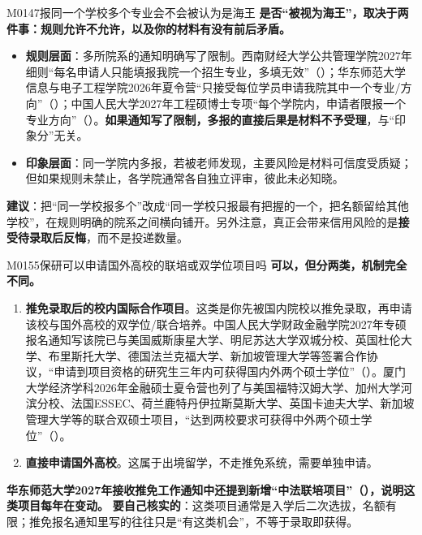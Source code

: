 \begin{qa}{M0147}{报同一个学校多个专业会不会被认为是海王}
\textbf{是否“被视为海王”，取决于两件事：规则允许不允许，以及你的材料有没有前后矛盾。}
\begin{itemize}
  \item \textbf{规则层面}：多所院系的通知明确写了限制。西南财经大学公共管理学院2027年细则“每名申请人只能填报我院一个招生专业，多填无效”（）；华东师范大学信息与电子工程学院2026年夏令营“只接受每位学员申请我院其中一个专业/方向”（）；中国人民大学2027年工程硕博士专项“每个学院内，申请者限报一个专业方向”（）。\textbf{如果通知写了限制，多报的直接后果是材料不予受理}，与“印象分”无关。
  \item \textbf{印象层面}：同一学院内多报，若被老师发现，主要风险是材料可信度受质疑；但如果规则未禁止，各学院通常各自独立评审，彼此未必知晓。
\end{itemize}
\textbf{建议}：把“同一学校报多个”改成“同一学校只报最有把握的一个，把名额留给其他学校”，在规则明确的院系之间横向铺开。另外注意，真正会带来信用风险的是\textbf{接受待录取后反悔}，而不是投递数量。
\end{qa}

\begin{qa}{M0155}{保研可以申请国外高校的联培或双学位项目吗}
\textbf{可以，但分两类，机制完全不同。}
\begin{enumerate}
  \item \textbf{推免录取后的校内国际合作项目}。这类是你先被国内院校以推免录取，再申请该校与国外高校的双学位/联合培养。中国人民大学财政金融学院2027年专硕报名通知写该院已与美国威斯康星大学、明尼苏达大学双城分校、英国杜伦大学、布里斯托大学、德国法兰克福大学、新加坡管理大学等签署合作协议，“申请到项目资格的研究生三年内可获得国内外两个硕士学位”（）。厦门大学经济学科2026年金融硕士夏令营也列了与美国福特汉姆大学、加州大学河滨分校、法国ESSEC、荷兰鹿特丹伊拉斯莫斯大学、英国卡迪夫大学、新加坡管理大学等的联合双硕士项目，“达到两校要求可获得中外两个硕士学位”（）。
  \item \textbf{直接申请国外高校}。这属于出境留学，不走推免系统，需要单独申请。
\end{enumerate}
\textbf{华东师范大学2027年接收推免工作通知中还提到新增“中法联培项目”（），说明这类项目每年在变动。}
\textbf{要自己核实的}：这类项目通常是入学后二次选拔，名额有限；推免报名通知里写的往往只是“有这类机会”，不等于录取即获得。
\end{qa}


